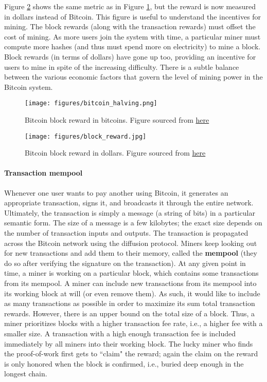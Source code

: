 \documentclass{article}
\newcommand{\pramod}[1]{{\color{red}
\footnotesize[Pramod: #1] }}
\begin{document}
Figure \ref{fig:block_rewards} shows the same metric as in Figure \ref{fig:bitcoin_halving}, but the reward is now measured in dollars instead of Bitcoin. This figure is useful to understand the incentives for mining. The block rewards (along with the transaction rewards) must offset the cost of mining. As more users join the system with time, a particular miner must compute more hashes (and thus must spend more on electricity) to mine a block. Block rewards (in terms of dollars) have gone up too, providing an incentive for users to mine in spite of the increasing difficulty. There is a subtle balance between the various economic factors that govern the level of mining power in the Bitcoin system.
\begin{figure}[p]
    \centering
    \texttt{[image: figures/bitcoin\_halving.png]}
    \caption{Bitcoin block reward in bitcoins. Figure sourced from \href{https://www.coindesk.com/bitcoin-halving-explainer}{here}}
    \label{fig:bitcoin_halving}
\end{figure}

\begin{figure}[p]
    \centering
    \texttt{[image: figures/block\_reward.jpg]}
    \caption{Bitcoin block reward in dollars. Figure sourced from \href{https://www.cmcmarkets.com/en/learn-cryptocurrencies/bitcoin-halving}{here}}
    \label{fig:block_rewards}
\end{figure}


\paragraph*{Transaction mempool}
Whenever one user wants to pay another using Bitcoin, it generates an appropriate transaction, signs it, and broadcasts it through the entire network. Ultimately, the transaction is simply a message (a string of bits) in a particular semantic form. The size of a message is  a few kilobytes; the exact size depends on the number of transaction inputs and outputs. The transaction is propagated across the Bitcoin network using the diffusion protocol. Miners keep looking out for new transactions and add them to their memory, called the \textbf{mempool} (they do so after verifying the signature on the transaction). At any given point in time, a miner is working on a particular block, which contains some transactions from its mempool. A miner can include new transactions from its mempool into its working block at will (or even remove them). As such, it would like to include as many transactions as possible in order to maximize its sum total transaction rewards. However, there is an upper bound on the total size of a block. Thus, a miner prioritizes blocks with a higher transaction fee rate, i.e., a higher fee with a smaller size. A transaction with a high enough transaction fee is included immediately by all miners into their working block. The lucky miner who finds the proof-of-work first gets to ``claim" the reward; again the claim on the reward is only honored when the block is confirmed, i.e., buried deep enough in the longest chain. 
\end{document}
